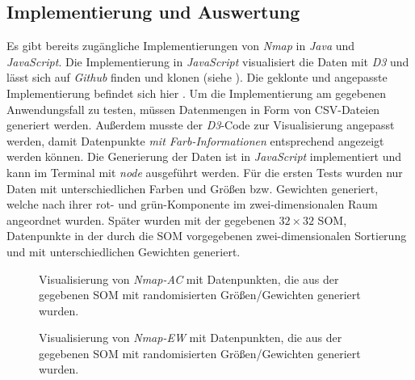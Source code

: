 \documentclass[12pt, ngerman, utf8]{article}
\begin{document}
\subsection{Implementierung und Auswertung}
Es gibt bereits zugängliche Implementierungen von \textit{Nmap} in \emph{Java} und \emph{JavaScript}. Die Implementierung in \emph{JavaScript} visualisiert die Daten mit \emph{D3} und lässt sich auf \emph{Github} finden und klonen (siehe \cite{nmapcode}). Die geklonte und angepasste Implementierung befindet sich hier \cite{nmapclone}.
Um die Implementierung am gegebenen Anwendungsfall zu testen, müssen Datenmengen in Form von CSV-Dateien generiert werden. Außerdem musste der \emph{D3}-Code zur Visualisierung angepasst werden, damit Datenpunkte \emph{mit Farb-Informationen} entsprechend angezeigt werden können. 
Die Generierung der Daten ist in \emph{JavaScript} implementiert und kann im Terminal mit \emph{node} ausgeführt werden. Für die ersten Tests wurden nur Daten mit unterschiedlichen Farben und Größen bzw. Gewichten generiert, welche nach ihrer rot- und grün-Komponente im zwei-dimensionalen Raum angeordnet wurden. Später wurden mit der gegebenen $32\times32$ SOM, Datenpunkte in der durch die SOM vorgegebenen zwei-dimensionalen Sortierung und mit unterschiedlichen Gewichten generiert. 

\begin{figure}[h]
    \noindent
    \caption{Visualisierung von \emph{Nmap-AC} mit Datenpunkten, die aus der gegebenen SOM mit randomisierten Größen/Gewichten generiert wurden.}
    \label{fig:nmap-ac}
\end{figure}

\begin{figure}[h]
    \noindent
    \caption{Visualisierung von \emph{Nmap-EW} mit Datenpunkten, die aus der gegebenen SOM mit randomisierten Größen/Gewichten generiert wurden.}
    \label{fig:nmap-ew}
\end{figure}
\end{document}
